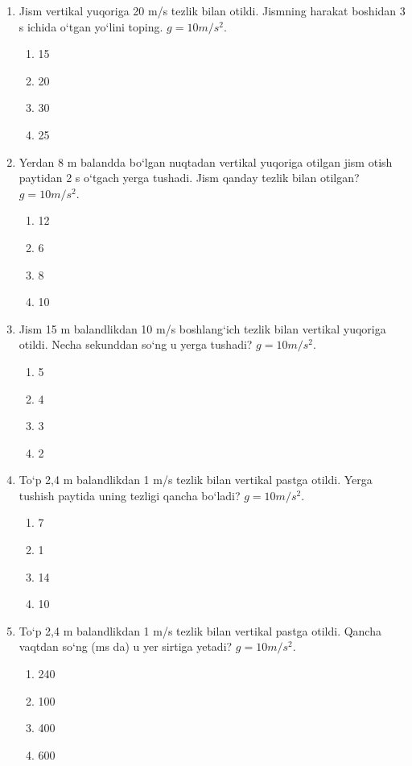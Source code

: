 \begin{enumerate}
\item Jism vertikal yuqoriga 20 m/s tezlik bilan otildi. Jismning harakat boshidan 3 s ichida o‘tgan yo‘lini toping. $g=10 m/s^2$.
\begin{enumerate}[label=\Alph*)]
\item 15
\item 20
\item 30
\item 25
\end{enumerate}

\item Yerdan 8 m balandda bo‘lgan nuqtadan vertikal yuqoriga otilgan jism otish paytidan 2 s o‘tgach yerga tushadi. Jism qanday tezlik bilan otilgan? $g=10 m/s^2$.
\begin{enumerate}[label=\Alph*)]
\item 12
\item 6
\item 8
\item 10
\end{enumerate}

\item Jism 15 m balandlikdan 10 m/s boshlang‘ich tezlik bilan vertikal yuqoriga otildi. Necha sekunddan so‘ng u yerga tushadi? $g=10 m/s^2$.
\begin{enumerate}[label=\Alph*)]
\item 5
\item 4
\item 3
\item 2
\end{enumerate}

\item To‘p 2,4 m balandlikdan 1 m/s tezlik bilan vertikal pastga otildi. Yerga tushish paytida uning tezligi qancha bo‘ladi? $g=10 m/s^2$.
\begin{enumerate}[label=\Alph*)]
\item 7
\item 1
\item 14
\item 10
\end{enumerate}

\item To‘p 2,4 m balandlikdan 1 m/s tezlik bilan vertikal pastga otildi. Qancha vaqtdan so‘ng (ms da) u yer sirtiga yetadi? $g=10 m/s^2$.
\begin{enumerate}[label=\Alph*)]
\item 240
\item 100
\item 400
\item 600
\end{enumerate}


\end{enumerate}
